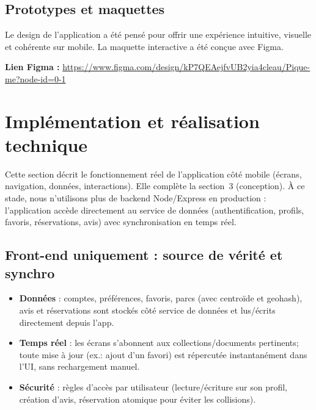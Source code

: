 \documentclass[12pt,a4paper]{article}
\begin{document}
\subsection{Prototypes et maquettes}

Le design de l'application a été pensé pour offrir une expérience intuitive, visuelle et cohérente sur mobile. La maquette interactive a été conçue avec Figma.

\vspace{0.5em}
\noindent\textbf{Lien Figma :} \url{https://www.figma.com/design/kP7QEAejfvUB2yia4cleau/Pique-me?node-id=0-1}



\clearpage
\section{Implémentation et réalisation technique}

Cette section décrit le fonctionnement réel de l’application côté mobile (écrans, navigation, données, interactions). Elle complète la section~3 (conception). À ce stade, nous n’utilisons plus de backend Node/Express en production : l’application accède directement au service de données (authentification, profils, favoris, réservations, avis) avec synchronisation en temps réel.

\subsection{Front-end uniquement : source de vérité et synchro}

\begin{itemize}
  \item \textbf{Données} : comptes, préférences, favoris, parcs (avec centroïde et geohash), avis et réservations sont stockés côté service de données et lus/écrits directement depuis l’app.
  \item \textbf{Temps réel} : les écrans s’abonnent aux collections/documents pertinents; toute mise à jour (ex.: ajout d’un favori) est répercutée instantanément dans l’UI, sans rechargement manuel.
  \item \textbf{Sécurité} : règles d’accès par utilisateur (lecture/écriture sur son profil, création d’avis, réservation atomique pour éviter les collisions).
\end{itemize}
\end{document}
